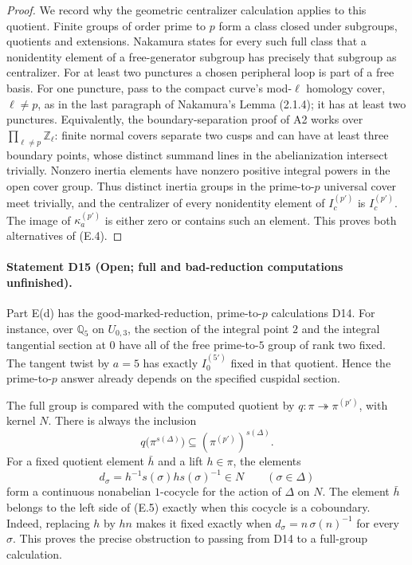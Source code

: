 \begin{proof}
We record why the geometric centralizer calculation applies to this
quotient.  Finite groups of order prime to $p$ form a class closed
under subgroups, quotients and extensions.  Nakamura
\cite[Lemma (2.1.2)]{Nakamura1994} states for every such full class that
a nonidentity element of a free-generator subgroup has precisely that
subgroup as centralizer.  For at least two punctures a chosen peripheral
loop is part of a free basis.  For one puncture, pass to the compact
curve's mod-$\ell$ homology cover, $\ell\ne p$, as in the last
paragraph of Nakamura's Lemma (2.1.4); it has at least two punctures.
Equivalently, the boundary-separation proof of A2 works over
$\prod_{\ell\ne p}\mathbb Z_\ell$: finite normal covers separate two
cusps and can have at least three boundary points, whose distinct
summand lines in the abelianization intersect trivially.  Nonzero
inertia elements have nonzero positive integral powers in the open
cover group.  Thus distinct inertia groups in the prime-to-$p$
universal cover meet trivially, and the centralizer of every
nonidentity element of $I_c^{(p')}$ is $I_c^{(p')}$.
The image of $\kappa_a^{(p')}$ is either zero or contains such an
element.  This proves both alternatives of (E.4).
\end{proof}

\paragraph{Statement D15 (Open; full and bad-reduction
computations unfinished).}\label{res:D15}
Part E(d) has the good-marked-reduction, prime-to-$p$ calculations D14.
For instance, over $\mathbb Q_5$ on $U_{0,3}$, the section of the
integral point $2$ and the integral tangential section at $0$ have all
of the free prime-to-$5$ group of rank two fixed.  The tangent twist by
$a=5$ has exactly $I_0^{(5')}$ fixed in that quotient.  Hence the
prime-to-$p$ answer already depends on the specified cuspidal section.

The full group is compared with the computed quotient by
$q:\pi\twoheadrightarrow\pi^{(p')}$, with kernel $N$.
There is always the inclusion
\[
       q\bigl(\pi^{s(\Delta)}\bigr)
                    \subseteq(\pi^{(p')})^{s(\Delta)}.          \tag{E.5}
\]
For a fixed quotient element $\bar h$ and a lift $h\in\pi$, the
elements
\[
           d_\sigma=h^{-1}s(\sigma)h s(\sigma)^{-1}\in N
                 \qquad(\sigma\in\Delta)
\]
form a continuous nonabelian $1$-cocycle for the action of $\Delta$ on
$N$.  The element $\bar h$ belongs to the left side of (E.5) exactly
when this cocycle is a coboundary.  Indeed, replacing $h$ by $hn$ makes
it fixed exactly when $d_\sigma=n\,\sigma(n)^{-1}$ for every $\sigma$.
This proves the precise obstruction to passing from D14 to a full-group
calculation.

